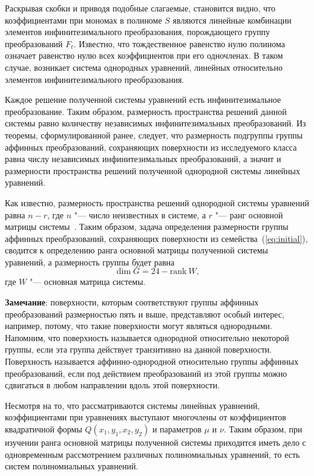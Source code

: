 \documentclass[../main.tex]{subfiles}
\begin{document}
Раскрывая скобки и приводя подобные слагаемые, становится видно, что коэффициентами при мономах в полиноме $S$ являются линейные комбинации элементов инфинитезимального преобразования, порождающего группу преобразований $F_t$. Известно, что тождественное равенство нулю полинома означает равенство нулю всех коэффициентов при его одночленах. В таком случае, возникает система однородных уравнений, линейных относительно элементов инфинитезимального преобразования.

Каждое решение полученной системы уравнений есть инфинитезимальное преобразование. Таким образом, размерность пространства решений данной системы равно количеству независимых инфинитезимальных преобразований. Из теоремы, сформулированной ранее, следует, что размерность подгруппы группы аффинных преобразований, сохраняющих поверхности из исследуемого класса равна числу независимых инфинитезимальных преобразований, а значит и размерности пространства решений полученной однородной системы линейных уравнений.

Как известно, размерность пространства решений однородной системы уравнений равна $n - r$, где $n$ "--- число неизвестных в системе, а $r$ "--- ранг основной матрицы системы~\cite{costrikin_va1}. Таким образом, задача определения размерности группы аффинных преобразований, сохраняющих поверхности из семейства~(\ref{eq:initial}), сводится к определению ранга основной матрицы полученной системы уравнений, а размерность группы будет равна
\begin{equation}\label{eq:dim_rank}
\dim G = 24 - \mathrm{rank}~W,
\end{equation}
где $W$ "--- основная матрица системы.

\textbf{Замечание}: поверхности, которым соответствуют группы аффинных преобразований размерностью пять и выше, представляют особый интерес, например, потому, что такие поверхности могут являться однородными. Напомним, что поверхность называется однородной относительно некоторой группы, если эта группа действует транзитивно на данной поверхности. Поверхность называется аффинно-однородной относительно группы аффинных преобразований, если под действием преобразований из этой группы можно сдвигаться в любом направлении вдоль этой поверхности.

Несмотря на то, что рассматриваются системы линейных уравнений, коэффициентами при уравнениях выступают многочлены от коэффициентов квадратичной формы $Q(x_1, y_1, x_2, y_2)$ и параметров $\mu$ и $\nu$. Таким образом, при изучении ранга основной матрицы полученной системы приходится иметь дело с одновременным рассмотрением различных полиномиальных уравнений, то есть систем полиномиальных уравнений.
\end{document}
